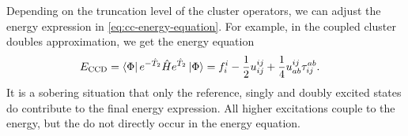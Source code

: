             Depending on the truncation level of the cluster operators, we can
            adjust the energy expression in \autoref{eq:cc-energy-equation}.
            For example, in the coupled cluster doubles approximation, we get
            the energy equation
            \begin{align}
                E_{\text{CCD}}
                &= \bra{\Phi}e^{-\hat{T}_2}\hat{H} e^{\hat{T}_2}\ket{\Phi}
                =
                f^{i}_{i}
                - \frac{1}{2} u^{ij}_{ij}
                + \frac{1}{4}u^{ij}_{ab} \tau^{ab}_{ij}.
                \label{eq:ccd-energy-equation}
            \end{align}
            It is a sobering situation that only the reference, singly and
            doubly excited states do contribute to the final energy expression.
            All higher excitations couple to the energy, but the do not directly
            occur in the energy equation.


